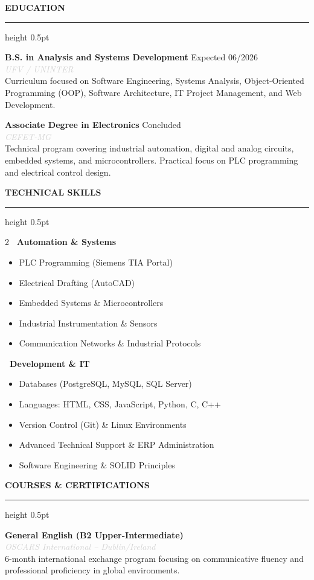 \documentclass[10pt,a4paper]{article}
\newcommand{\cvsection}[1]{
    \vspace{12pt}
    {\large\textcolor{sectcol}{\textbf{\MakeUppercase{#1}}}}
    \vspace{2pt}
    \hrule height 0.5pt \relax
    \vspace{6pt}
}
\newcommand{\cvevent}[4]{
    \noindent \textbf{#2} \hfill \textcolor{sectcol}{\small \faCalendar* #1} \\
    \noindent \textit{\textcolor{lightgray}{#3}} \vspace{4pt} \\
    {#4} \vspace{8pt}
}
\begin{document}
\cvsection{Education}

\cvevent{Expected 06/2026}{B.S. in Analysis and Systems Development}{UFV / UNINTER}{
Curriculum focused on Software Engineering, Systems Analysis, Object-Oriented Programming (OOP), Software Architecture, IT Project Management, and Web Development.
}

\cvevent{Concluded}{Associate Degree in Electronics}{CEFET-MG}{
Technical program covering industrial automation, digital and analog circuits, embedded systems, and microcontrollers. Practical focus on PLC programming and electrical control design.
}

\cvsection{Technical Skills}

\begin{multicols}{2}
    \textbf{\faIndustry \ Automation \& Systems}
    \begin{itemize}
        \item PLC Programming (Siemens TIA Portal)
        \item Electrical Drafting (AutoCAD)
        \item Embedded Systems \& Microcontrollers
        \item Industrial Instrumentation \& Sensors
        \item Communication Networks \& Industrial Protocols
    \end{itemize}

    \columnbreak

    \textbf{\faLaptopCode \ Development \& IT}
    \begin{itemize}
        \item Databases (PostgreSQL, MySQL, SQL Server)
        \item Languages: HTML, CSS, JavaScript, Python, C, C++
        \item Version Control (Git) \& Linux Environments
        \item Advanced Technical Support \& ERP Administration
        \item Software Engineering \& SOLID Principles
    \end{itemize}
\end{multicols}

\cvsection{Courses \& Certifications}
\cvevent{2019}{General English (B2 Upper-Intermediate)}{OSCARS International -- Dublin/Ireland}{
6-month international exchange program focusing on communicative fluency and professional proficiency in global environments.
}
\end{document}

